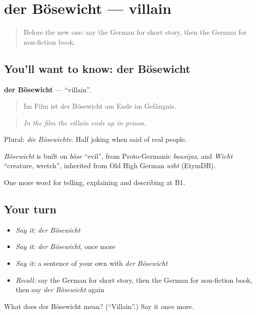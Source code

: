 \section[der Bösewicht]{der Bösewicht — villain}

\label{lesson:GE-C520-boesewicht}



\begin{quote}
Before the new one: say the German for short story, then the German for non-fiction book.
\end{quote}

\subsection*{You'll want to know: der Bösewicht}
\textbf{der Bösewicht} — \textquotedblleft{}villain\textquotedblright{}.

\begin{quote}
Im Film ist der Bösewicht am Ende im Gefängnis.
\end{quote}

\begin{quote}
\emph{In the film the villain ends up in prison.}
\end{quote}

Plural: \emph{die Bösewichte}. Half joking when said of real people.

\begin{cousinweb}
\emph{Bösewicht} is built on \emph{böse} \textquotedblleft{}evil\textquotedblright{}, from Proto-Germanic \emph{bausijaz}, and \emph{Wicht} \textquotedblleft{}creature, wretch\textquotedblright{}, inherited from Old High German \emph{wiht} (EtymDB).
\end{cousinweb}

\begin{grammarlens}[title={What you've built}]
One more word for telling, explaining and describing at B1.
\end{grammarlens}

\subsection*{Your turn}
\begin{itemize}
\raggedright
  \item \emph{Say it:} \emph{der Bösewicht}
  \item \emph{Say it:} \emph{der Bösewicht}, once more
  \item \emph{Say it:} a sentence of your own with \emph{der Bösewicht}
  \item \emph{Recall:} say the German for short story, then the German for non-fiction book, then say \emph{der Bösewicht} again
\end{itemize}

\begin{tcolorbox}[breakable,colback=teal!4,colframe=teal!35!black,title={Before you move on}]
What does der Bösewicht mean? (\textquotedblleft{}Villain\textquotedblright{}.) Say it once more.
\end{tcolorbox}
